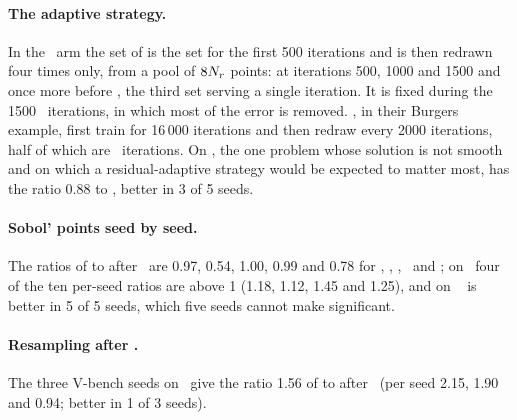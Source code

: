 \paragraph{The adaptive strategy.} In the \AdamLBFGS\ arm the set of  is the
 set for the first 500 iterations and is then redrawn four times only, from
a pool of $8N_{r}$ points: at iterations 500, 1000 and 1500 and once more before \LBFGS,
the third set serving a single iteration. It is fixed during the 1500 \LBFGS\ iterations,
in which most of the error is removed. \citet{wu2023}, in their Burgers example, first
train for 16\,000 iterations and then redraw every 2000 iterations, half of which are
\LBFGS\ iterations. On \PLthree, the one problem whose solution is not smooth and on which a
residual-adaptive strategy would be expected to matter most,  has the ratio 0.88
to , better in 3 of 5 seeds.

\paragraph{Sobol' points seed by seed.}
The ratios of  to  after \AdamLBFGS\ are 0.97, 0.54, 1.00, 0.99 and
0.78 for \PH, \PLtwo, \PWone, \PWtwo\ and \PLthree; on \PH\ four of the ten per-seed ratios
are above 1 (1.18, 1.12, 1.45 and 1.25), and on \PLthree\  is better in 5 of 5
seeds, which five seeds cannot make significant.

\paragraph{Resampling after \LBFGS.} The three \textsf{V-bench} seeds on \PLtwo\ give the
ratio 1.56 of  to  after \AdamLBFGS\ (per seed 2.15, 1.90 and
0.94; better in 1 of 3 seeds).

